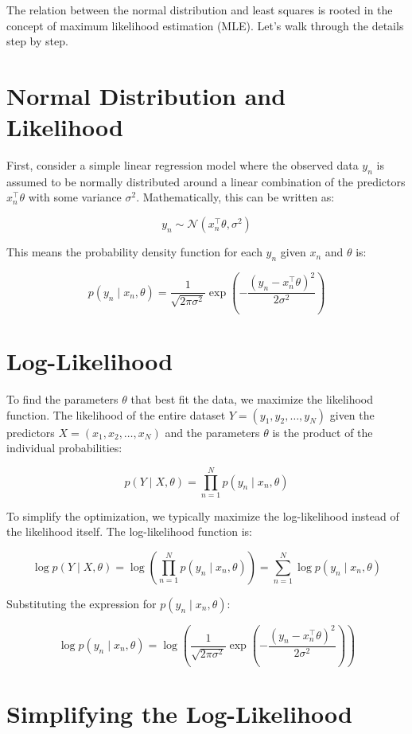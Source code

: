 \documentclass{article}
\begin{document}
The relation between the normal distribution and least squares is rooted in the concept of maximum likelihood estimation (MLE). Let's walk through the details step by step.

\section*{Normal Distribution and Likelihood}

First, consider a simple linear regression model where the observed data \( y_n \) is assumed to be normally distributed around a linear combination of the predictors \( x_n^\top \theta \) with some variance \(\sigma^2\). Mathematically, this can be written as:

\[
y_n \sim \mathcal{N}(x_n^\top \theta, \sigma^2)
\]

This means the probability density function for each \( y_n \) given \( x_n \) and \( \theta \) is:

\[
p(y_n \mid x_n, \theta) = \frac{1}{\sqrt{2\pi\sigma^2}} \exp\left( -\frac{(y_n - x_n^\top \theta)^2}{2\sigma^2} \right)
\]

\section*{Log-Likelihood}

To find the parameters \(\theta\) that best fit the data, we maximize the likelihood function. The likelihood of the entire dataset \( Y = (y_1, y_2, \ldots, y_N) \) given the predictors \( X = (x_1, x_2, \ldots, x_N) \) and the parameters \(\theta\) is the product of the individual probabilities:

\[
p(Y \mid X, \theta) = \prod_{n=1}^N p(y_n \mid x_n, \theta)
\]

To simplify the optimization, we typically maximize the log-likelihood instead of the likelihood itself. The log-likelihood function is:

\[
\log p(Y \mid X, \theta) = \log \left( \prod_{n=1}^N p(y_n \mid x_n, \theta) \right) = \sum_{n=1}^N \log p(y_n \mid x_n, \theta)
\]

Substituting the expression for \( p(y_n \mid x_n, \theta) \):

\[
\log p(y_n \mid x_n, \theta) = \log \left( \frac{1}{\sqrt{2\pi\sigma^2}} \exp\left( -\frac{(y_n - x_n^\top \theta)^2}{2\sigma^2} \right) \right)
\]

\section*{Simplifying the Log-Likelihood}
\end{document}
